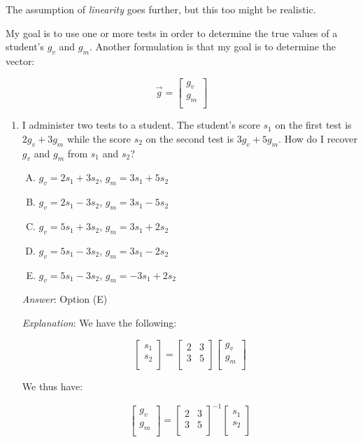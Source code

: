 \documentclass[10pt]{amsart}
\begin{document}
The assumption of {\em linearity} goes further, but this too might be
realistic.

My goal is to use one or more tests in order to determine the true
values of a student's $g_v$ and $g_m$. Another formulation is that my
goal is to determine the vector:

$$\vec{g} = \left[ \begin{matrix} g_v \\ g_m \\\end{matrix}\right]$$
\begin{enumerate}
\item I administer two tests to a student. The student's score $s_1$
  on the first test is $2g_v + 3g_m$ while the score $s_2$ on the
  second test is $3g_v + 5g_m$. How do I recover $g_v$ and $g_m$ from
  $s_1$ and $s_2$?

  \begin{enumerate}[(A)]
  \item $g_v = 2s_1 + 3s_2$, $g_m = 3s_1 + 5s_2$
  \item $g_v = 2s_1 - 3s_2$, $g_m = 3s_1 - 5s_2$
  \item $g_v = 5s_1 + 3s_2$, $g_m  = 3s_1 + 2s_2$
  \item $g_v = 5s_1 - 3s_2$, $g_m = 3s_1 - 2s_2$
  \item $g_v = 5s_1 - 3s_2$, $g_m = -3s_1 + 2s_2$
  \end{enumerate}

  {\em Answer}: Option (E)

  {\em Explanation}: We have the following:

  $$\left[ \begin{matrix} s_1 \\ s_2 \\\end{matrix}\right] = \left[ \begin{matrix} 2 & 3 \\ 3 & 5 \\\end{matrix}\right] \left[ \begin{matrix} g_v \\ g_m \\\end{matrix}\right]$$

  We thus have:

  $$\left[ \begin{matrix} g_v \\ g_m \\\end{matrix}\right] = \left[ \begin{matrix} 2 & 3 \\ 3 & 5 \\\end{matrix}\right]^{-1} \left[\begin{matrix} s_1 \\ s_2 \\\end{matrix}\right]$$


\end{enumerate}
\end{document}
